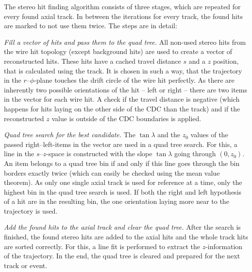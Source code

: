 The stereo hit finding algorithm consists of three stages, which are repeated for every found axial track. In between the iterations for every track, the found hits are marked to not use them twice. The steps are in detail:
\begin{zlist}
  \item \textit{Fill a vector of hits and pass them to the quad tree.} All non-used stereo hits from the wire hit topology (except background hits) are used to create a vector of reconstructed hits. These hits have a cached travel distance $s$ and a $z$ position, that is calculated using the track. It is chosen in such a way, that the trajectory in the $r$--$\phi$-plane touches the drift circle of the wire hit perfectly. As there are inherently two possible orientations of the hit -- left or right -- there are two items in the vector for each wire hit. A check if the travel distance is negative (which happens for hits laying on the other side of the CDC than the track) and if the reconstructed $z$ value is outside of the CDC boundaries is applied. 
  \item \textit{Quad tree search for the best candidate.} The $\tan \lambda$ and the $z_0$ values of the passed right--left-items in the vector are used in a quad tree search. For this, a line in the $s$--$z$-space is constructed with the slope $\tan \lambda$ going through $(0, z_0)$. An item belongs to a quad tree bin if and only if this line goes through the bin borders exactly twice (which can easily be checked using the mean value theorem). As only one single axial track is used for reference at a time, only the highest bin in the quad tree search is used. If both the right and left hypothesis of a hit are in the resulting bin, the one orientation laying more near to the trajectory is used.
  \item \textit{Add the found hits to the axial track and clear the quad tree.} After the search is finished, the found stereo hits are added to the axial hits and the whole track hits are sorted correctly. For this, a line fit is performed to extract the $z$-information of the trajectory. In the end, the quad tree is cleared and prepared for the next track or event.
\end{zlist}

